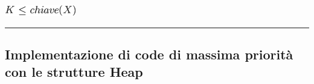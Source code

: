 \documentclass{article}
\begin{document}
{\includegraphics{images/image143.png}

\begin{center}\rule{0.5\linewidth}{\linethickness}\end{center}

\subsection{\texorpdfstring{{}}{}}\label{h.7vrdkvwj5vt}

\hypertarget{h.aocay3iqens1}{\subsection{\texorpdfstring{{Implementazione di code di massima priorità con le strutture Heap}}{Implementazione di code di massima priorità con le strutture Heap}}\label{h.aocay3iqens1}}

{}

\protect\hypertarget{t.fb709a8e208067c1bfab491f087053eba0be66c5}{}{}\protect\hypertarget{t.19}{}{}

}
\end{document}
